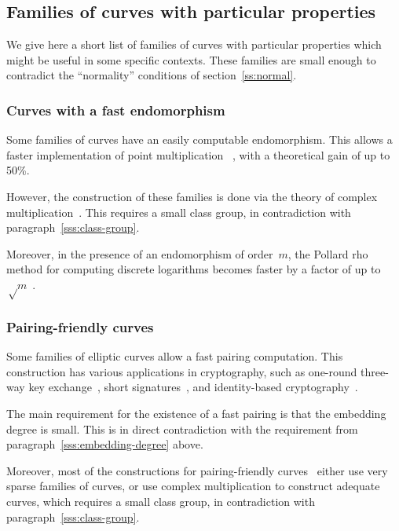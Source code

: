 \documentclass[twocolumn,letterpaper,10pt]{article}
\begin{document}
\subsection{Families of curves with particular properties}
\label{ss:particular}

We give here a short list of families of curves
with particular properties which might be useful in some specific contexts.
These families are small enough
to contradict the ``normality'' conditions of section~\ref{ss:normal}.

\subsubsection{Curves with a fast endomorphism}

Some families of curves have an easily computable endomorphism.
This allows a faster implementation of point multiplication%
~\cite{crypto2001glv,joc2011gls}, with a theoretical gain of up to 50\%.

However, the construction of these families
is done via the theory of complex multiplication~\cite{asia2013smith}.
This requires a small class group,
in contradiction with paragraph~\ref{sss:class-group}.

Moreover, in the presence of an endomorphism of order~$m$,
the Pollard rho method for computing discrete logarithms
becomes faster by a factor of up to~$√m$~\cite{asia1999dgm,moc2000glv}.

\subsubsection{Pairing-friendly curves}
\label{sss:pairing}

Some families of elliptic curves allow a fast pairing computation.
This construction has various applications in cryptography,
such as one-round three-way key exchange~\cite{jc2004joux},
short signatures~\cite{jc2004bls},
and identity-based cryptography~\cite{crypto2001bf,el2002paterson}.

The main requirement for the existence of a fast pairing
is that the embedding degree is small.
This is in direct contradiction with
the requirement from paragraph~\ref{sss:embedding-degree} above.

Moreover, most of the constructions
for pairing-friendly curves~\cite{jc2010fst,space2014em}
either use very sparse families of curves,
or use complex multiplication to construct adequate curves,
which requires a small class group,
in contradiction with paragraph~\ref{sss:class-group}.
\end{document}
